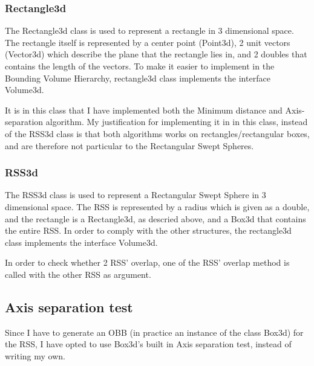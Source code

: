\subsubsection{Rectangle3d}
\label{rectangle3d}
The Rectangle3d class is used to represent a rectangle in 3 dimensional space. The rectangle itself is represented by a center point (Point3d), 2 unit vectors (Vector3d) which describe the plane that the rectangle lies in, and 2 doubles that contains the length of the vectors. To make it easier to implement in the Bounding Volume Hierarchy, rectangle3d class implements the interface Volume3d.

It is in this class that I have implemented both the Minimum distance and Axis-separation algorithm. My justification for implementing it in in this class, instead of the RSS3d class is that both algorithms works on rectangles/rectangular boxes, and are therefore not particular to the Rectangular Swept Spheres.

\subsubsection{RSS3d}
\label{RSS3d}
The RSS3d class is used to represent a Rectangular Swept Sphere in 3 dimensional space. The RSS is represented by a radius which is given as a double, and the rectangle is a Rectangle3d, as descried above, and a Box3d that contains the entire RSS. In order to comply with the other structures, the rectangle3d class implements the interface Volume3d.

In order to check whether 2 RSS' overlap, one of the RSS' overlap method is called with the other RSS as argument. 

\subsection{Axis separation test}
\label{implementation_axis_sep}
Since I have to generate an OBB (in practice an instance of the class Box3d) for the RSS, I have opted to use Box3d's built in Axis separation test, instead of writing my own.
